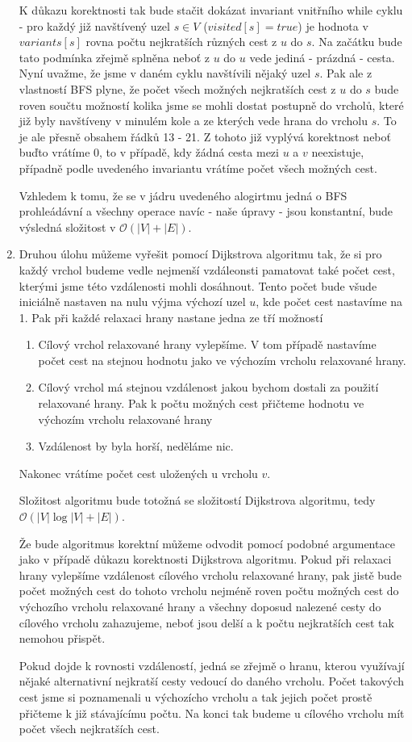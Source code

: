 \documentclass[12pt,a4paper]{article}
\theoremstyle{plain}
\begin{document}
\begin{enumerate}[1.]
K důkazu korektnosti tak bude stačit dokázat invariant vnitřního while cyklu - pro každý již navštívený uzel $ s \in V $ ($visited[s] = true $) je hodnota v $ variants[s] $ rovna počtu nejkratších různých cest z $ u $ do $ s $. Na začátku bude tato podmínka zřejmě splněna neboť z $ u $ do $ u $ vede jediná - prázdná - cesta. Nyní uvažme, že jsme v daném cyklu navštívili nějaký uzel $ s $. Pak ale z vlastností BFS plyne, že počet všech možných nejkratších cest z $ u $ do $ s $ bude roven součtu možností kolika jsme se mohli dostat postupně do vrcholů, které již byly navštíveny v minulém kole a ze kterých vede hrana do vrcholu $ s $. To je ale přesně obsahem řádků 13 - 21. Z tohoto již vyplývá korektnost neboť buďto vrátíme 0, to v případě, kdy žádná cesta mezi $ u $ a $ v $ neexistuje, případně podle uvedeného invariantu vrátíme počet všech možných cest.


Vzhledem k tomu, že se v jádru uvedeného alogirtmu jedná o BFS prohleádávní a všechny operace navíc - naše úpravy - jsou konstantní, bude výsledná složitost v $ \mathcal{O}(|V| + |E|)$.

\item
Druhou úlohu můžeme vyřešit pomocí Dijkstrova algoritmu tak, že si pro každý vrchol budeme vedle nejmenší vzdáleonsti pamatovat také počet cest, kterými jsme této vzdálenosti mohli dosáhnout. Tento počet bude všude iniciálně nastaven na nulu výjma výchozí uzel $ u $, kde počet cest nastavíme na 1. Pak při každé relaxaci hrany nastane jedna ze tří možností
\begin{enumerate}
\item Cílový vrchol relaxované hrany vylepšíme. V tom případě nastavíme počet cest na stejnou hodnotu jako ve výchozím vrcholu relaxované hrany.
\item Cílový vrchol má stejnou vzdálenost jakou bychom dostali za použití relaxované hrany. Pak k počtu možných cest přičteme hodnotu ve výchozím vrcholu relaxované hrany
\item Vzdálenost by byla horší, neděláme nic.
\end{enumerate}
Nakonec vrátíme počet cest uložených u vrcholu $ v $.

Složitost algoritmu bude totožná se složitostí Dijkstrova algoritmu, tedy $ \mathcal{O}(|V|\log|V| + |E|)$. 

Že bude algoritmus korektní můžeme odvodit pomocí podobné argumentace jako v případě důkazu korektnosti Dijkstrova algoritmu. Pokud při relaxaci hrany vylepšíme vzdálenost cílového vrcholu relaxované hrany, pak jistě bude počet možných cest do tohoto vrcholu nejméně roven počtu možných cest do výchozího vrcholu relaxované hrany a všechny doposud nalezené cesty do cílového vrcholu zahazujeme, neboť jsou delší a k počtu nejkratších cest tak nemohou přispět. 

Pokud dojde k rovnosti vzdáleností, jedná se zřejmě o hranu, kterou využívají nějaké alternativní nejkratší cesty vedoucí do daného vrcholu. Počet takových cest jsme si poznamenali u výchozícho vrcholu a tak jejich počet prostě přičteme k již stávajícímu počtu. Na konci tak budeme u cílového vrcholu mít počet všech nejkratších cest.

\end{enumerate}
\end{document}
